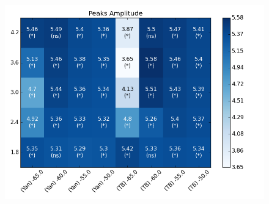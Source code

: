 \documentclass[11pt]{article}
\begin{document}
 \begin{figure}
\begin{center}
\includegraphics[scale=.4]{heatmap_Peaks_Amplitude.png}
\end{center}
\end{figure}
 
\end{document}
